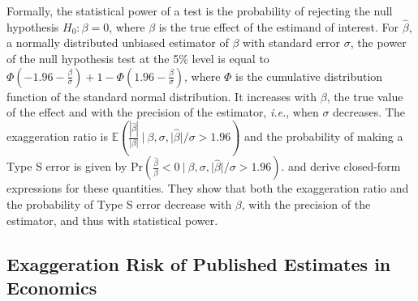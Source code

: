 \documentclass[12pt]{article}
\begin{document}
    Formally, the statistical power of a test is the probability of rejecting the null hypothesis $H_{0}: \beta = 0$, where $\beta$ is the true effect of the estimand of interest. For $\hat{\beta}$, a normally distributed unbiased estimator of $\beta$ with standard error $\sigma$, the power of the null hypothesis test at the 5\% level is equal to $\Phi(-1.96-\frac{\beta}{\sigma})+1-\Phi(1.96-\frac{\beta}{\sigma})$, where $\Phi$ is the cumulative distribution function of the standard normal distribution. It increases with $\beta$, the true value of the effect and with the precision of the estimator, \textit{i.e.}, when $\sigma$ decreases. The exaggeration ratio is $\mathbb{E}(\frac{|\hat{\beta}|}{|\beta|} \ | \ \beta, \sigma, |\hat{\beta}|/\sigma>1.96)$ and the probability of making a Type S error is given by $\text{Pr}(\frac{\hat{\beta}}{\beta} < 0 \ | \ \beta, \sigma, |\hat{\beta}|/\sigma>1.96 )$.  \cite{zwet_significance_2021} and \cite{lu_note_2019} derive closed-form expressions for these quantities. They show that both the exaggeration ratio and the probability of Type S error decrease with $\beta$, with the precision of the estimator, and thus with statistical power.
    
    	\vspace{0.4cm}
	\subsection{Exaggeration Risk of Published Estimates in Economics}
	
\end{document}
